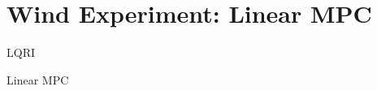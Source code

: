 \ETHslide
\section*{Wind Experiment: Linear MPC}
\vspace*{\fill}

\begin{minipage}{0.5\textwidth}
	\centering
	\tiny{
	
	\tiny{LQRI}
	}
\end{minipage}
\begin{minipage}{0.5\textwidth}
\centering
\tiny{

	\tiny{Linear MPC}
}
\end{minipage}

\vspace*{\fill}
\clearpage